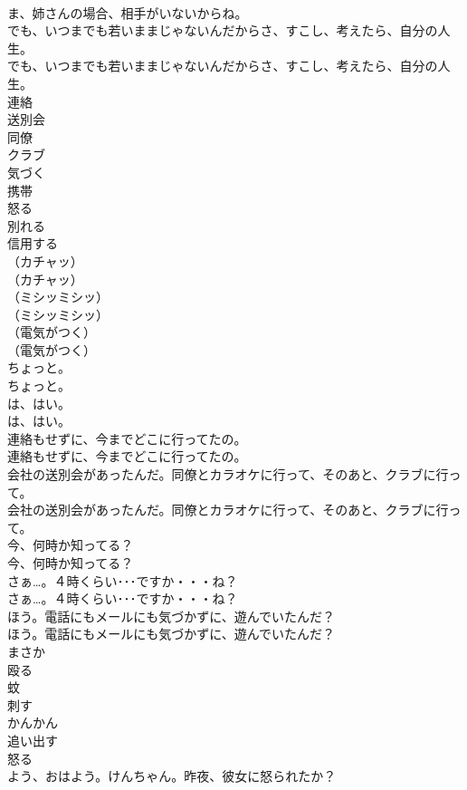 \documentclass[8pt]{extreport}
\begin{document}
\begin{CJK}{UTF8}{min}
\\	ま、姉さんの場合、相手がいないからね。 
\\	でも、いつまでも若いままじゃないんだからさ、すこし、考えたら、自分の人生。	
\\	でも、いつまでも若いままじゃないんだからさ、すこし、考えたら、自分の人生。 
\\	連絡
\\	送別会
\\	同僚
\\	クラブ
\\	気づく
\\	携帯
\\	怒る
\\	別れる
\\	信用する
\\	（カチャッ）	
\\	（カチャッ） 
\\	（ミシッミシッ）	
\\	（ミシッミシッ） 
\\	（電気がつく）	
\\	（電気がつく） 
\\	ちょっと。	
\\	ちょっと。 
\\	は、はい。	
\\	は、はい。 
\\	連絡もせずに、今までどこに行ってたの。	
\\	連絡もせずに、今までどこに行ってたの。 
\\	会社の送別会があったんだ。同僚とカラオケに行って、そのあと、クラブに行って。	
\\	会社の送別会があったんだ。同僚とカラオケに行って、そのあと、クラブに行って。 
\\	今、何時か知ってる？	
\\	今、何時か知ってる？ 
\\	さぁ…。４時くらい･･･ですか・・・ね？	
\\	さぁ…。４時くらい･･･ですか・・・ね？ 
\\	ほう。電話にもメールにも気づかずに、遊んでいたんだ？	
\\	ほう。電話にもメールにも気づかずに、遊んでいたんだ？ 
\\	まさか
\\	殴る
\\	蚊
\\	刺す
\\	かんかん
\\	追い出す
\\	怒る
\\	よう、おはよう。けんちゃん。昨夜、彼女に怒られたか？	

\end{CJK}
\end{document}
